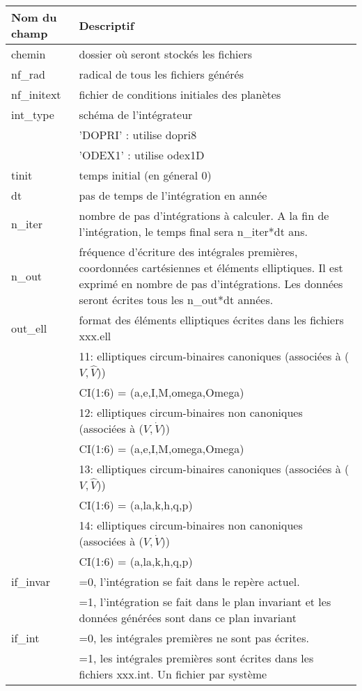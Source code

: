 \documentclass[11pt]{article}
\begin{document}
\begin{tabularx}{\textwidth}{|l|X|}
\hline
Nom du champ& Descriptif \\ \hline 
chemin   & dossier o\`u seront stock\'es les fichiers \\ \hline
 nf\_rad    & radical de tous les fichiers g\'en\'er\'es\\ \hline
 nf\_initext& fichier de conditions initiales des plan\`etes\\ \hline
 int\_type& sch\'ema de l'int\'egrateur  \\
&'DOPRI' : utilise dopri8 \\
&'ODEX1' : utilise odex1D \\
 \hline
 tinit & temps initial (en g\'eneral 0) \\ \hline
 dt& pas de temps de l'int\'egration en ann\'ee \\ \hline
 n\_iter& nombre de pas d'int\'egrations \`a calculer. A la fin de l'int\'egration, le temps final sera  n\_iter*dt ans.\\ \hline
 n\_out & fr\'equence d'\'ecriture des int\'egrales premi\`eres, coordonn\'ees cart\'esiennes et \'el\'ements elliptiques. Il est exprim\'e en nombre de pas d'int\'egrations. Les donn\'ees seront \'ecrites tous les n\_out*dt ann\'ees.
 \\ \hline
 out\_ell & format des \'el\'ements elliptiques \'ecrites dans les fichiers xxx.ell \\
&11:  elliptiques circum-binaires canoniques (associ\'ees \`a ($V,\hat{V}$))\\
&	     CI(1:6) = (a,e,I,M,omega,Omega)\\
&12:  elliptiques circum-binaires non canoniques (associ\'ees \`a ($V,\dot{V}$))\\
&	     CI(1:6) = (a,e,I,M,omega,Omega)\\
&13:  elliptiques circum-binaires canoniques (associ\'ees \`a ($V,\hat{V}$))\\
&	     CI(1:6) = (a,la,k,h,q,p)\\
&14:  elliptiques circum-binaires non canoniques (associ\'ees \`a ($V,\dot{V}$))\\
&	     CI(1:6) = (a,la,k,h,q,p)\\
 \hline
 if\_invar & =0, l'int\'egration se fait dans le rep\`ere actuel. \\
& =1, l'int\'egration se fait dans le plan invariant et les donn\'ees g\'en\'er\'ees sont dans ce plan invariant 
\\ \hline

 if\_int & =0, les int\'egrales premi\`eres ne sont pas \'ecrites.\\
&=1, les int\'egrales premi\`eres sont \'ecrites dans les fichiers xxx.int. Un fichier par syst\`eme\\ \hline
 

\end{tabularx}
\end{document}
